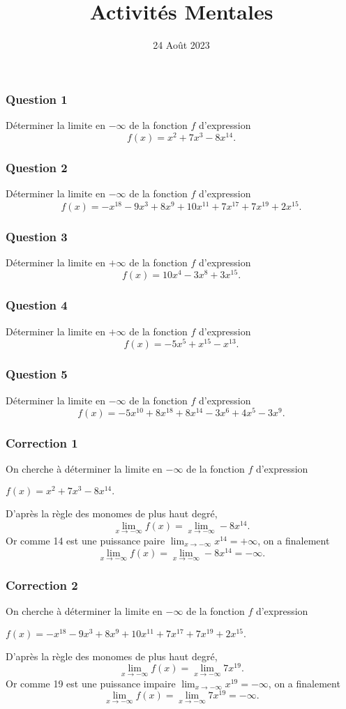 \documentclass[15pt, mathserif]{beamer}
\title{Activités Mentales}
\date{24 Août 2023}
\begin{document}
\begin{frame}
    \titlepage
\end{frame}

\begin{frame} 
	\frametitle{Question 1}
Déterminer la limite en $-\infty$ de la fonction $f$ d'expression \[f(x)=x^{2}+7x^{3}-8x^{14}.\]\end{frame}


\begin{frame} 
	\frametitle{Question 2}
Déterminer la limite en $-\infty$ de la fonction $f$ d'expression \[f(x)=-x^{18}-9x^{3}+8x^{9}+10x^{11}+7x^{17}+7x^{19}+2x^{15}.\]\end{frame}


\begin{frame} 
	\frametitle{Question 3}
Déterminer la limite en $+\infty$ de la fonction $f$ d'expression \[f(x)=10x^{4}-3x^{8}+3x^{15}.\]\end{frame}


\begin{frame} 
	\frametitle{Question 4}
Déterminer la limite en $+\infty$ de la fonction $f$ d'expression \[f(x)=-5x^{5}+x^{15}-x^{13}.\]\end{frame}


\begin{frame} 
	\frametitle{Question 5}
Déterminer la limite en $-\infty$ de la fonction $f$ d'expression \[f(x)=-5x^{10}+8x^{18}+8x^{14}-3x^{6}+4x^{5}-3x^{9}.\]\end{frame}


\begin{frame}
\vspace{-10mm}
	\frametitle{Correction 1}
On cherche à déterminer la limite en $-\infty$ de la fonction $f$ d'expression 

\hfil $f(x)=x^{2}+7x^{3}-8x^{14}.$


D'après la règle des monomes de plus haut degré, \[ \lim_{x \rightarrow -\infty} f(x) = \lim_{x \rightarrow -\infty}-8x^{14}.\]Or comme 14 est une puissance paire $\displaystyle\lim_{x \rightarrow -\infty}x^{14} = +\infty$, on a finalement \[ \lim_{x \rightarrow -\infty} f(x) = \lim_{x \rightarrow -\infty}-8x^{14} = -\infty.\]\end{frame}


\begin{frame}
\vspace{-10mm}
	\frametitle{Correction 2}
On cherche à déterminer la limite en $-\infty$ de la fonction $f$ d'expression 

\hfil $f(x)=-x^{18}-9x^{3}+8x^{9}+10x^{11}+7x^{17}+7x^{19}+2x^{15}.$


D'après la règle des monomes de plus haut degré, \[ \lim_{x \rightarrow -\infty} f(x) = \lim_{x \rightarrow -\infty}7x^{19}.\]Or comme 19 est une puissance impaire $\displaystyle\lim_{x \rightarrow -\infty}x^{19} = -\infty$, on a finalement \[ \lim_{x \rightarrow -\infty} f(x) = \lim_{x \rightarrow -\infty}7x^{19} = -\infty.\]\end{frame}
\end{document}

